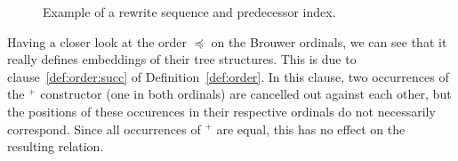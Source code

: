 \begin{figure}
\begin{center}
\begin{tikzpicture}

\end{tikzpicture}
\end{center}
\caption{Example of a rewrite sequence and predecessor
  index.}\label{fig:pred}
\end{figure}

Having a closer look at the order $\preceq$ on the Brouwer ordinals, we can
see that it really defines embeddings of their tree structures. This is due to
clause~\ref{def:order:succ} of Definition~\ref{def:order}. In this clause,
two occurrences of the $^+$ constructor (one in both ordinals) are cancelled
out against each other, but the positions of these occurences in their
respective ordinals do not necessarily correspond. Since all occurrences of
$^+$ are equal, this has no effect on the resulting relation.

